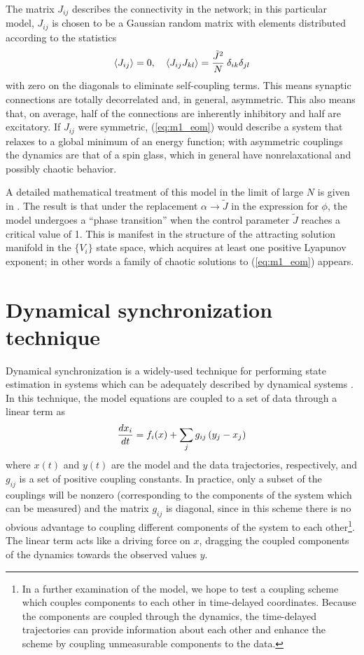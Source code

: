 \documentclass{article} %
\begin{document}
The matrix $J_{ij}$ describes the connectivity in the network; in this particular model, $J_{ij}$ is chosen to be a Gaussian random matrix with elements distributed according to the statistics
\begin{align}
	\left\langle J_{ij} \right\rangle = 0, \quad \left\langle J_{ij}J_{kl} \right\rangle = \frac{\tilde{J}^2}{N} \: \delta_{ik}\delta_{jl} \label{eq:m1_stats}
\end{align}
with zero on the diagonals to eliminate self-coupling terms.  This means synaptic connections are totally decorrelated and, in general, asymmetric.  This also means that, on average, half of the connections are inherently inhibitory and half are excitatory.  If $J_{ij}$ were symmetric, (\ref{eq:m1_eom}) would describe a system that relaxes to a global minimum of an energy function; with asymmetric couplings the dynamics are that of a spin glass, which in general have nonrelaxational and possibly chaotic behavior.

A detailed mathematical treatment of this model in the limit of large $N$ is given in \cite{Sompolinsky1988}.  The result is that under the replacement $\alpha \rightarrow \tilde{J}$ in the expression for $\phi$, the model undergoes a ``phase transition'' when the control parameter $\tilde{J}$ reaches a critical value of 1.  This is manifest in the structure of the attracting solution manifold in the $\{V_i\}$ state space, which acquires at least one positive Lyapunov exponent; in other words a family of chaotic solutions to (\ref{eq:m1_eom}) appears.

\section{Dynamical synchronization technique}
Dynamical synchronization is a widely-used technique for performing state estimation in systems which can be adequately described by dynamical systems \cite{Abarbanel2009}.  In this technique, the model equations are coupled to a set of data through a linear term as
\begin{align}
	\frac{d x_i}{d t} = f_i(x) + \sum_{j} g_{ij} \left(y_j - x_j\right)
\end{align}
where $x(t)$ and $y(t)$ are the model and the data trajectories, respectively, and $g_{ij}$ is a set of positive coupling constants.  In practice, only a subset of the couplings will be nonzero (corresponding to the components of the system which can be measured) and the matrix $g_{ij}$ is diagonal, since in this scheme there is no obvious advantage to coupling different components of the system to each other\footnote{In a further examination of the model, we hope to test a coupling scheme which couples components to each other in time-delayed coordinates.  Because the components are coupled through the dynamics, the time-delayed trajectories can provide information about each other and enhance the scheme by coupling unmeasurable components to the data.}.  The linear term acts like a driving force on $x$, dragging the coupled components of the dynamics towards the observed values $y$.
\end{document}
